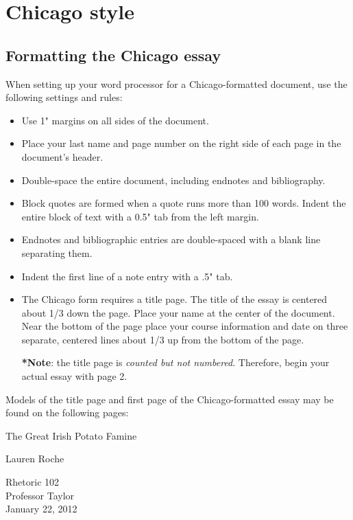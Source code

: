 
\chapter{Chicago style}

\section{Formatting the Chicago essay}

When setting up your word processor for a Chicago-formatted document, use the 
following settings and rules:

\begin{itemize}
\item Use 1" margins on all sides of the document.
\item Place your last name and page number on the right side of each page in the 
document's header.
\item Double-space the entire document, including endnotes and bibliography.
\item Block quotes are formed when a quote runs more than 100 words. Indent the entire 
block of text with a 0.5" tab from the left margin.
\item Endnotes and bibliographic entries are double-spaced with a blank line separating 
them.
\item Indent the first line of a note entry with a .5" tab.
\item The Chicago form requires a title page. The title of the essay is centered about 
1/3 down the page. Place your name at the center of the document. Near the bottom 
of the page place your course information and date on three separate, centered lines 
about 1/3 up from the bottom of the page.

\textbf{*}\textbf{Note}: the title page is \emph{counted but not numbered}. Therefore, 
begin your actual essay with page 2.
\end{itemize}

Models of the title page and first page of the Chicago-formatted essay may be found on 
the following pages:

\newpage
\thispagestyle{empty}
\begin{Spacing}{2}
\vspace* {3cm}
\begin{center}The Great Irish Potato Famine\end{center}
\vspace {4cm}
\begin{center}Lauren Roche\end{center}
\vspace {5cm}
\begin{center}Rhetoric 102\\
Professor Taylor\\
January 22, 2012\end{center}
\end{Spacing}
\newpage

